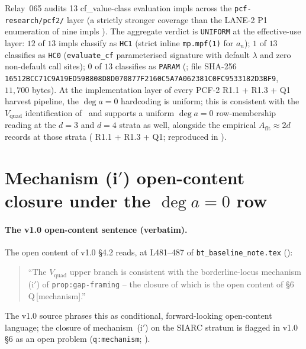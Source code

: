 \documentclass[11pt,reqno]{amsart}
\theoremstyle{plain}
\theoremstyle{definition}
\theoremstyle{remark}
\newcommand{\Afit}{A_{\mathrm{fit}}}
\newcommand{\dega}{\deg a}
\newcommand{\Vquad}{V_{\mathrm{quad}}}
\begin{document}
Relay~065 audits 13 cf\_value-class evaluation impls across the
\texttt{pcf-research/pcf2/} layer (a strictly stronger coverage
than the LANE-2 P1 enumeration of nine impls
\cite[L37--74]{lane2_independent_depth_probe}). The aggregate
verdict is \texttt{UNIFORM} at the effective-use layer:
$12$ of $13$ impls classify as \texttt{HC1} (strict inline
\verb|mp.mpf(1)| for $a_n$); $1$ of $13$ classifies as
\texttt{HC0} (\texttt{evaluate\_cf} parameterised signature with
default $\lambda$ and zero non-default call sites);
$0$ of $13$ classifies as \texttt{PARAM}
(\cite[\S 4]{cf_value_audit_pcf2_9impls_065}; file SHA-256
\verb|16512BCC71C9A19ED59B808D8D070877F2160C5A7A062381C0FC9533182D3BF9|,
$11{,}700$ bytes). At the implementation layer of every
PCF-2 R1.1 + R1.3 + Q1 harvest pipeline, the $\dega = 0$
hardcoding is uniform; this is consistent with the $\Vquad$
identification of~ and supports a
uniform $\dega = 0$ row-membership reading at the $d = 3$ and
$d = 4$ strata as well, alongside the empirical
$\Afit \approx 2d$ records at those strata
(\cite{papanokechi_pcf2_v13} R1.1 + R1.3 + Q1; reproduced in
\cite[\S 4.1]{bt_baseline_note_v10}).

\section{Mechanism \textup{(i$'$)} open-content closure under
the $\dega = 0$ row}
\label{sec:closure}

\paragraph{The v1.0 open-content sentence (verbatim).}
The open content of v1.0 \S 4.2 reads, at L481--487 of
\texttt{bt\_baseline\_note.tex}
(\cite[L481--487]{bt_baseline_note_v10}):

\begin{quote}
``The $\Vquad$ upper branch is consistent with the
borderline-locus mechanism \textup{(i$'$)} of
\texttt{prop:gap-framing} -- the closure of which is the open
content of \S 6 Q\,[mechanism].''
\end{quote}

\noindent
The v1.0 source phrases this as conditional, forward-looking
open-content language; the closure of mechanism~\textup{(i$'$)}
on the SIARC stratum is flagged in v1.0 \S 6 as an open
problem (\texttt{q:mechanism}; \cite[\S 6]{bt_baseline_note_v10}).
\end{document}
